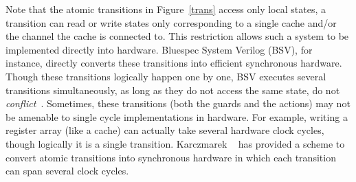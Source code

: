 Note that the atomic transitions in Figure~\ref{trans} access only local states,
\ie{} a transition can read or write states only corresponding to a single cache
and/or the channel the cache is connected to. This restriction allows such a
system to be implemented directly into hardware. Bluespec System Verilog (BSV),
for instance, directly converts these transitions into efficient synchronous
hardware. Though these transitions logically happen one by one, BSV executes
several transitions simultaneously, as long as they do not access the same
state, \ie{} do not \emph{conflict}~\cite{Hoe:TCAD,HoeArvind:TRSSynthesis1}.
Sometimes, these transitions (both the guards and the actions) may not be
amenable to single cycle implementations in hardware. For example, writing a
register array (like a cache) can actually take several hardware clock cycles,
though logically it is a single transition.  Karczmarek \etal~\cite{Karczmarek}
has provided a scheme to convert atomic transitions into synchronous hardware
in which each transition can span several clock cycles.





















